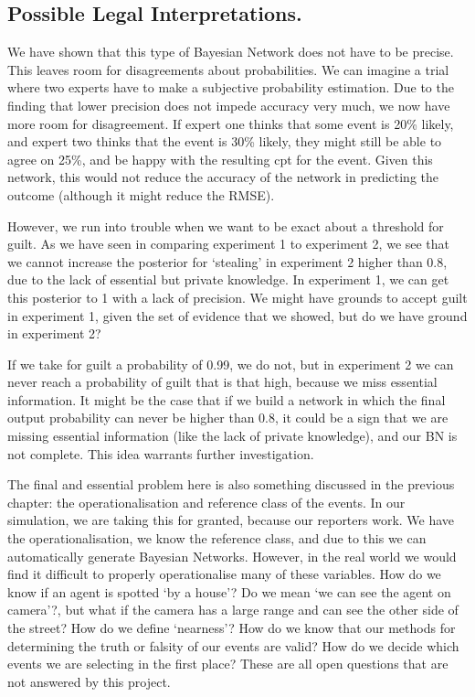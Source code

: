 \subsection{Possible Legal Interpretations.}
We have shown that this type of Bayesian Network does not have to be precise. This leaves room for disagreements about probabilities. We can imagine a trial where two experts have to make a subjective probability estimation. Due to the finding that lower precision does not impede accuracy very much, we now have more room for disagreement. If expert one thinks that some event is 20\% likely, and expert two thinks that the event is 30\% likely, they might still be able to agree on 25\%, and be happy with the resulting cpt for the event. Given this network, this would not reduce the accuracy of the network in predicting the outcome (although it might reduce the RMSE).  

However, we run into trouble when we want to be exact about a threshold for guilt. As we have seen in comparing experiment 1 to experiment 2, we see that we cannot increase the posterior for `stealing' in experiment 2 higher than 0.8, due to the lack of essential but private knowledge. In experiment 1, we can get this posterior to 1 with a lack of precision. We might have grounds to accept guilt in experiment 1, given the set of evidence that we showed, but do we have ground in experiment 2? 

If we take for guilt a probability of 0.99, we do not, but in experiment 2 we can never reach a probability of guilt that is that high, because we miss essential information. It might be the case that if we build a network in which the final output probability can never be higher than 0.8, it could be a sign that we are missing essential information (like the lack of private knowledge), and our BN is not complete. This idea warrants further investigation.

The final and essential problem here is also something discussed in the previous chapter: the operationalisation and reference class of the events. In our simulation, we are taking this for granted, because our reporters work. We have the operationalisation, we know the reference class, and due to this we can automatically generate Bayesian Networks. However, in the real world we would find it difficult to properly operationalise many of these variables. How do we know if an agent is spotted `by a house'? Do we mean `we can see the agent on camera'?, but what if the camera has a large range and can see the other side of the street? How do we define `nearness'? How do we know that our methods for determining the truth or falsity of our events are valid? How do we decide which events we are selecting in the first place? These are all open questions that are not answered by this project.

